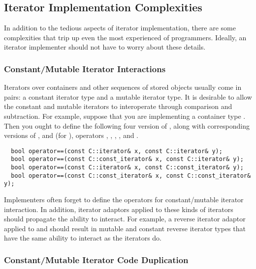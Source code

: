 \documentclass{netobjectdays}
\begin{document}
\subsection{Iterator Implementation Complexities}

In addition to the tedious aspects of iterator implementation, there
are some complexities that trip up even the most experienced of
programmers. Ideally, an iterator implementer should not have to worry
about these details.

\subsubsection{Constant/Mutable Iterator Interactions}
\label{sec:constant-mutable-iterations}

Iterators over containers and other sequences of stored objects
usually come in pairs: a constant iterator type and a mutable iterator
type. It is desirable to allow the constant and mutable iterators to
interoperate through comparison and
subtraction. For example, suppose
that you are implementing a container type . Then you ought to
define the following four version of , along with
corresponding versions of , and (for
), operators \code{<}, \code{>},
\code{<=}, \code{>=}, and \code{-}.

{\footnotesize
\begin{verbatim}
  bool operator==(const C::iterator& x, const C::iterator& y);
  bool operator==(const C::const_iterator& x, const C::iterator& y);
  bool operator==(const C::iterator& x, const C::const_iterator& y);
  bool operator==(const C::const_iterator& x, const C::const_iterator& y);
\end{verbatim}
}

Implementers often forget to define the operators for constant/mutable
iterator interaction. In addition, iterator adaptors applied to these
kinds of iterators should propagate the ability to interact. For
example, a reverse iterator adaptor applied to  and
 should result in mutable and constant reverse iterator types that
have the same ability to interact as the  iterators do.

\subsubsection{Constant/Mutable Iterator Code Duplication}
\end{document}
